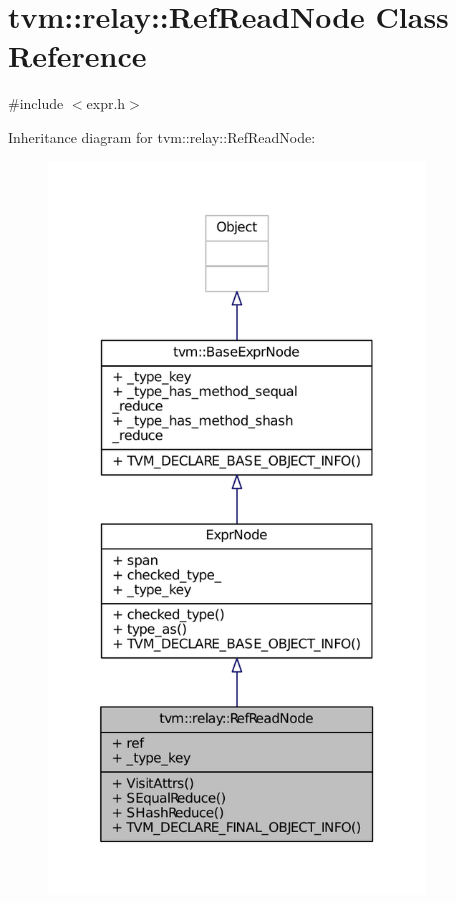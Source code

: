 \hypertarget{classtvm_1_1relay_1_1RefReadNode}{}\section{tvm\+:\+:relay\+:\+:Ref\+Read\+Node Class Reference}
\label{classtvm_1_1relay_1_1RefReadNode}


{\ttfamily \#include $<$expr.\+h$>$}



Inheritance diagram for tvm\+:\+:relay\+:\+:Ref\+Read\+Node\+:
\nopagebreak
\begin{figure}[H]
\begin{center}
\leavevmode
\includegraphics[height=550pt]{classtvm_1_1relay_1_1RefReadNode__inherit__graph}
\end{center}
\end{figure}


